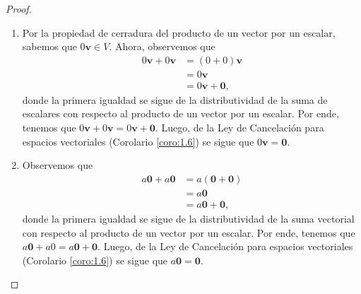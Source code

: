 \documentclass[apuntes]{subfiles}
\begin{document}
\begin{proof}\leavevmode
    \begin{enumerate}[label=(\alph*)]

        \item Por la propiedad de cerradura del producto de un vector por un escalar, sabemos que $0\mathbf{v}\in V$. Ahora, observemos que
            \begin{align*}
                0\mathbf{v}+0\mathbf{v}&=(0+0)\mathbf{v} \tag{distributividad} \\
                                       &=0\mathbf{v} \\
                                       &=0\mathbf{v}+\mathbf{0} \tag{neutro aditivo},
            \end{align*}
            donde la primera igualdad se sigue de la distributividad de la suma de escalares con respecto al producto de un vector por un escalar. Por ende, tenemos que $0\mathbf{v}+0\mathbf{v} =0\mathbf{v}+\mathbf{0}$. Luego, de la Ley de Cancelación para espacios vectoriales (Corolario \ref{coro:1.6}) se sigue que $0\mathbf{v}=\mathbf{0}$.

        \item Observemos que
            \begin{align*}
                a\mathbf{0}+a\mathbf{0}&=a(\mathbf{0}+\mathbf{0}) \\
                                       &=a\mathbf{0}\\
                                       &=a\mathbf{0}+\mathbf{0},
            \end{align*}
            donde la primera igualdad se sigue de la distributividad de la suma vectorial con respecto al producto de un vector por un escalar. Por ende, tenemos que $a\mathbf{0}+a0\mathbf{}=a\mathbf{0}+\mathbf{0}$. Luego, de la Ley de Cancelación para espacios vectoriales (Corolario \ref{coro:1.6}) se sigue que $a\mathbf{0}=\mathbf{0}$.


\end{enumerate}
\end{proof}
\end{document}
